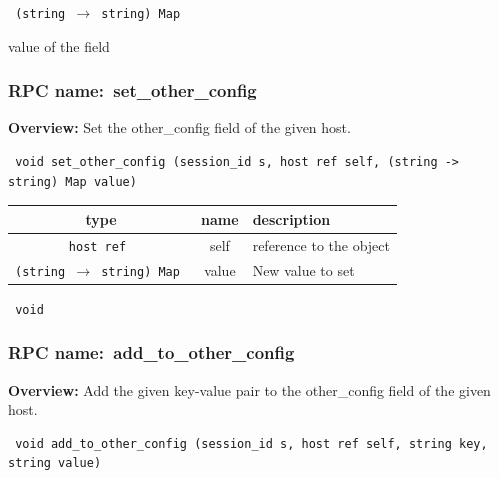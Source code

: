 \vspace{0.3cm}

{\tt 
(string $\rightarrow$ string) Map
}


value of the field
\vspace{0.3cm}
\vspace{0.3cm}
\vspace{0.3cm}
\subsubsection{RPC name:~set\_other\_config}

{\bf Overview:} 
Set the other\_config field of the given host.

\begin{verbatim} void set_other_config (session_id s, host ref self, (string -> string) Map value)\end{verbatim}



 
\vspace{0.3cm}
\begin{tabular}{|c|c|p{7cm}|}
 \hline
{\bf type} & {\bf name} & {\bf description} \\ \hline
{\tt host ref } & self & reference to the object \\ \hline 

{\tt (string $\rightarrow$ string) Map } & value & New value to set \\ \hline 

\end{tabular}

\vspace{0.3cm}

{\tt 
void
}



\vspace{0.3cm}
\vspace{0.3cm}
\vspace{0.3cm}
\subsubsection{RPC name:~add\_to\_other\_config}

{\bf Overview:} 
Add the given key-value pair to the other\_config field of the given host.

\begin{verbatim} void add_to_other_config (session_id s, host ref self, string key, string value)\end{verbatim}


